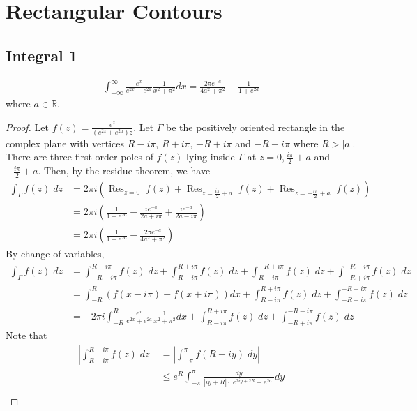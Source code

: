 \section{Rectangular Contours}

\subsection{Integral 1}
\begin{align*}
\int_{-\infty}^\infty \frac{e^x}{e^{2x}+e^{2a}}\frac{1}{x^2+\pi^2}dx = \frac{2\pi e^{-a}}{4a^2+\pi^2}-\frac{1}{1+e^{2a}}
\end{align*}
where $a\in \mathbb{R}$.
\begin{proof}
Let $\displaystyle f(z) = \frac{e^z}{(e^{2z}+e^{2a})z}$. Let $\Gamma$ be the positively oriented rectangle in the complex plane with vertices $R-i\pi$, $R+i\pi$, $-R+i\pi$ and $-R-i\pi$ where $R>|a|$. There are three first order poles of $f(z)$ lying inside $\Gamma$ at $z= 0, \frac{i\pi}{2}+a$ and $-\frac{i\pi}{2}+a$. Then, by the residue theorem, we have
\begin{align*}
\int_\Gamma f(z)\; dz &= 2\pi i \left( \mathop{\text{Res}}_{z=0} \; f(z) +  \mathop{\text{Res}}_{z=\frac{i\pi}{2}+a} \; f(z) +  \mathop{\text{Res}}_{z=-\frac{i\pi}{2}+a} \; f(z)\right) \\
&= 2\pi i \left( \frac{1}{1+e^{2a}} - \frac{i e^{-a}}{2a+i\pi} + \frac{i e^{-a}}{2a-i\pi}\right) \\
&= 2\pi i \left( \frac{1}{1+e^{2a}} - \frac{2\pi e^{-a}}{4a^2 +\pi^2}\right) \tag{1} 
\end{align*}
By change of variables,
\begin{align*}
 \int_\Gamma f(z) \; dz &= \int_{-R-i\pi}^{R-i\pi} f(z)\; dz + \int_{R-i\pi}^{R+i\pi} f(z)\; dz + \int_{R+i\pi}^{-R+i\pi} f(z)\; dz + \int_{-R+i\pi}^{-R-i\pi} f(z)\; dz \\
&= \int_{-R}^{R} \left(f(x-i\pi)-f(x+i\pi) \right) dx + \int_{R-i\pi}^{R+i\pi} f(z)\; dz + \int_{-R+i\pi}^{-R-i\pi} f(z)\; dz \\
&= -2\pi i \int_{-R}^{R} \frac{e^x}{e^{2x}+e^{2a}}\frac{1}{x^2+\pi^2} dx + \int_{R-i\pi}^{R+i\pi} f(z)\; dz + \int_{-R+i\pi}^{-R-i\pi} f(z)\; dz \tag{2}
\end{align*}
Note that
\begin{align*}
\left| \int_{R-i\pi}^{R+i\pi} f(z)\; dz\right| &= \left|\int_{-\pi}^\pi f(R+iy)\; dy \right| \\
&\leq e^R \int_{-\pi}^\pi \frac{dy}{|iy+R|\cdot |e^{2iy+2R}+e^{2a}|}dy \\

\end{align*}
\end{proof}

